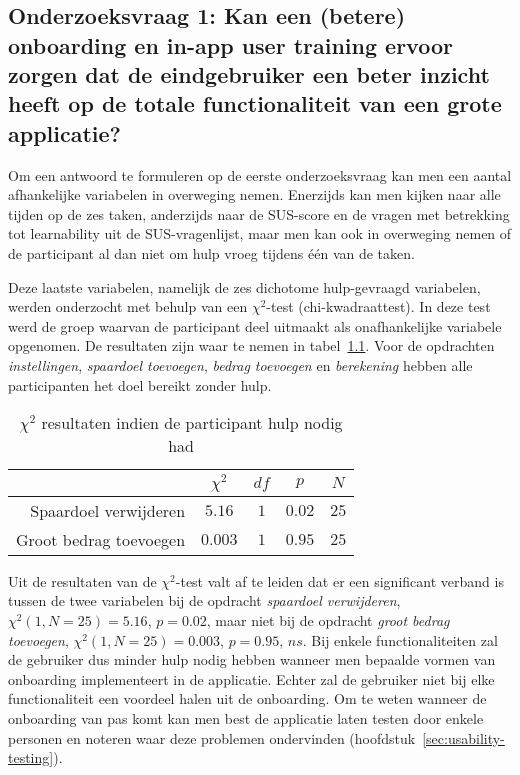 \chapter{}
\label{ch:resultaten}

\section[Onderzoeksvraag 1]{Onderzoeksvraag 1: Kan een (betere) onboarding en in-app user training ervoor zorgen dat de eindgebruiker een beter inzicht heeft op de totale functionaliteit van een grote applicatie?}
\label{sec:onderzoeksvraag-1}

Om een antwoord te formuleren op de eerste onderzoeksvraag kan men een aantal afhankelijke variabelen in overweging nemen. Enerzijds kan men kijken naar alle tijden op de zes taken, anderzijds naar de SUS-score en de vragen met betrekking tot learnability uit de SUS-vragenlijst, maar men kan ook in overweging nemen of de participant al dan niet om hulp vroeg tijdens één van de taken.

Deze laatste variabelen, namelijk de zes dichotome hulp-gevraagd variabelen, werden onderzocht met behulp van een $\chi^2$-test (chi-kwadraattest). In deze test werd de groep waarvan de participant deel uitmaakt als onafhankelijke variabele opgenomen. De resultaten zijn waar te nemen in tabel~\ref{tab:chisq-hulp}. Voor de opdrachten \textit{instellingen}, \textit{spaardoel toevoegen}, \textit{bedrag toevoegen} en \textit{berekening} hebben alle participanten het doel bereikt zonder hulp.

\begin{table}[]
    \centering
    \begin{tabular}{r|cccc}
        & $\chi^2$ & $df$ & $p$ & $N$ \\ \hline
        Spaardoel verwijderen & $5.16$ & $1$ & $0.02$ & $25$ \\
        Groot bedrag toevoegen & $0.003$ & $1$ & $0.95$ & $25$
    \end{tabular}
    \caption{$\chi^2$ resultaten indien de participant hulp nodig had}
    \label{tab:chisq-hulp}
\end{table}

Uit de resultaten van de $\chi^2$-test valt af te leiden dat er een significant verband is tussen de twee variabelen bij de opdracht \textit{spaardoel verwijderen}, $\chi^2 (1, N = 25) = 5.16$, $p = 0.02$, maar niet bij de opdracht \textit{groot bedrag toevoegen}, $\chi^2 (1, N = 25) = 0.003$, $p = 0.95$, $ns$. Bij enkele functionaliteiten zal de gebruiker dus minder hulp nodig hebben wanneer men bepaalde vormen van onboarding implementeert in de applicatie. Echter zal de gebruiker niet bij elke functionaliteit een voordeel halen uit de onboarding. Om te weten wanneer de onboarding van pas komt kan men best de applicatie laten testen door enkele personen en noteren waar deze problemen ondervinden (hoofdstuk~\ref{sec:usability-testing}).

